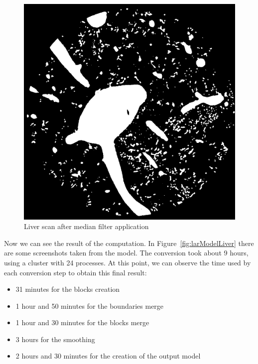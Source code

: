 \begin{figure}[htb] %
   \centering
   \includegraphics[width=0.40\linewidth]{images/Liver2.png}\hfill
   \caption[Liver scan after median filter application]{Liver scan after median filter application}
   \label{fig:LarliverModel2}
\end{figure}

Now we can see the result of the computation. In Figure~\ref{fig:larModelLiver} there are some screenshots taken from the model. The conversion took about 9 hours, using a cluster with 24 processes. At this point, we can observe the time used by each conversion step to obtain this final result:
\begin{itemize}
 \item 31 minutes for the blocks creation
 \item 1 hour and 50 minutes for the boundaries merge
 \item 1 hour and 30 minutes for the blocks merge
 \item 3 hours for the smoothing
 \item 2 hours and 30 minutes for the creation of the output model
\end{itemize}

